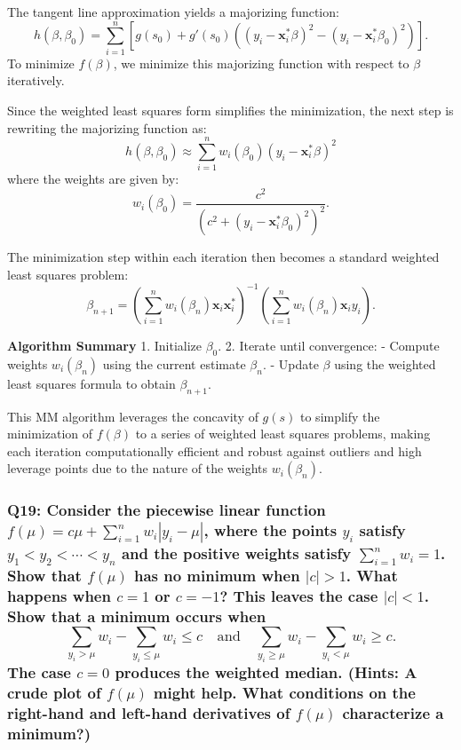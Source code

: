 \documentclass[8pt]{article}
\begin{document}
The tangent line approximation yields a majorizing function:
\[ h(\beta, \beta_0) = \sum_{i=1}^{n} \left[ g(s_0) + g'(s_0) \left((y_i - \mathbf{x}_i^* \beta)^2 - (y_i - \mathbf{x}_i^* \beta_0)^2\right) \right]. \]
To minimize \(f(\beta)\), we minimize this majorizing function with respect to \(\beta\) iteratively.

Since the weighted least squares form simplifies the minimization, the next step is rewriting the majorizing function as:
\[ h(\beta, \beta_0) \approx \sum_{i=1}^{n} w_i (\beta_0) (y_i - \mathbf{x}_i^* \beta)^2 \]
where the weights are given by:
\[ w_i(\beta_0) = \frac{c^2}{(c^2 + (y_i - \mathbf{x}_i^* \beta_0)^2)^2}. \]

The minimization step within each iteration then becomes a standard weighted least squares problem:
\[ \beta_{n+1} = \left(\sum_{i=1}^{n} w_i(\beta_n) \mathbf{x}_i \mathbf{x}_i^*\right)^{-1} \left(\sum_{i=1}^{n} w_i(\beta_n) \mathbf{x}_i y_i\right). \]

\textbf{Algorithm Summary}
1. Initialize \(\beta_0\).
2. Iterate until convergence:
   - Compute weights \( w_i(\beta_n) \) using the current estimate \(\beta_n\).
   - Update \(\beta\) using the weighted least squares formula to obtain \(\beta_{n+1}\).

This MM algorithm leverages the concavity of \(g(s)\) to simplify the minimization of \(f(\beta)\) to a series of weighted least squares problems, making each iteration computationally efficient and robust against outliers and high leverage points due to the nature of the weights \(w_i(\beta_n)\).

\subsubsection*{Q19: Consider the piecewise linear function \( f(\mu) = c\mu + \sum_{i=1}^{n} w_i |y_i - \mu| \), where the points \( y_i \) satisfy \( y_1 < y_2 < \cdots < y_n \) and the positive weights satisfy \( \sum_{i=1}^{n} w_i = 1 \). Show that \( f(\mu) \) has no minimum when \( |c| > 1 \). What happens when \( c = 1 \) or \( c = -1 \)? This leaves the case \( |c| < 1 \). Show that a minimum occurs when
\[
\sum_{y_i > \mu} w_i - \sum_{y_i \leq \mu} w_i \leq c \quad \text{and} \quad \sum_{y_i \geq \mu} w_i - \sum_{y_i < \mu} w_i \geq c.
\]
The case \( c = 0 \) produces the weighted median. (Hints: A crude plot of \( f(\mu) \) might help. What conditions on the right-hand and left-hand derivatives of \( f(\mu) \) characterize a minimum?)}
\end{document}
